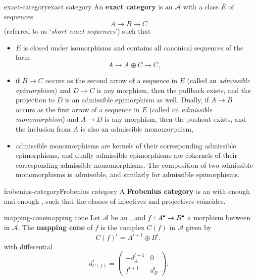 \begin{topic}{exact-category}{exact category}
    An \textbf{exact category} is an  $\mathcal{A}$ with a class $E$ of sequences
    \[ A \to B \to C \]
    (referred to as `\textit{short exact sequences}') such that
    \begin{itemize}
        \item $E$ is closed under isomorphisms and contains all canonical sequences of the form
        \[ A \to A \oplus C \to C , \]
        \item if $B \to C$ occurs as the second arrow of a sequence in $E$ (called an \textit{admissible epimorphism}) and $D \to C$ is any morphism, then the pullback exists, and the projection to $D$ is an admissible epimorphism as well. Dually, if $A \to B$ occurs as the first arrow of a sequence in $E$ (called an \textit{admissible monomorphism}) and $A \to D$ is any morphism, then the pushout exists, and the inclusion from $A$ is also an admissible monomorphism,
        \item admissible monomorphisms are kernels of their corresponding admissible epimorphisms, and dually admissible epimorphisms are cokernels of their corresponding admissible monomorphisms. The composition of two admissible monomorphisms is admissible, and similarly for admissible epimorphisms.
    \end{itemize}
\end{topic}

\begin{topic}{frobenius-category}{Frobenius category}
    A \textbf{Frobenius category} is an  with enough  and enough , such that the classes of injectives and projectives coincides.
\end{topic}

\begin{topic}{mapping-cone}{mapping cone}
    Let $\mathcal{A}$ be an , and $f : A^\bdot \to B^\bdot$ a morphism between  in $\mathcal{A}$. The \textbf{mapping cone} of $f$ is the complex $C(f)$ in $\mathcal{A}$ given by
    \[ C(f)^i = A^{i + 1} \oplus B^i , \]
    with differential
    \[ d_{C(f)}^i = \begin{pmatrix} -d_A^{i + 1} & 0 \\ f^{i + 1} & d_B^i \end{pmatrix} . \]    
\end{topic}

